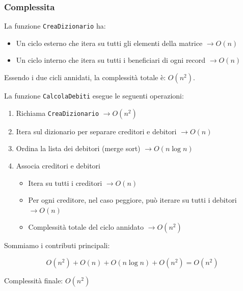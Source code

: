 \subsubsection{Complessita}

La funzione \texttt{CreaDizionario} ha:

\begin{itemize}
    \item Un ciclo esterno che itera su tutti gli elementi della matrice $\rightarrow O(n)$
    \item Un ciclo interno che itera su tutti i beneficiari di ogni record $\rightarrow O(n)$
\end{itemize}

Essendo i due cicli annidati, la complessità totale è: $O(n^2)$.

La funzione \texttt{CalcolaDebiti} esegue le seguenti operazioni:

\begin{enumerate}
    \item Richiama \texttt{CreaDizionario} $\rightarrow O(n^2)$
    \item Itera sul dizionario per separare creditori e debitori $\rightarrow O(n)$
    \item Ordina la lista dei debitori (merge sort) $\rightarrow O(n \log n)$
    \item Associa creditori e debitori
    \begin{itemize}
        \item Itera su tutti i creditori $\rightarrow O(n)$
        \item Per ogni creditore, nel caso peggiore, può iterare su tutti i debitori $\rightarrow O(n)$
        \item Complessità totale del ciclo annidato $\rightarrow O(n^2)$
    \end{itemize}
\end{enumerate}

Sommiamo i contributi principali:

\[ O(n^2) + O(n) + O(n \log n) + O(n^2) = O(n^2) \]

Complessità finale: $O(n^2)$